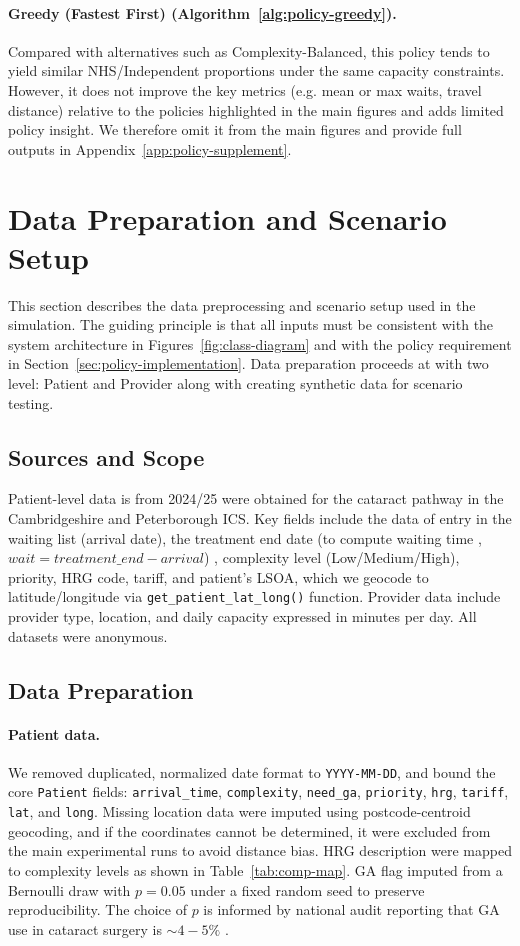 \documentclass[ %
                    author={Nattanan Nawakitbamrung},
                supervisor={Dr. Sébastien Rochat},
                    degree={MSc},
                     title={Developing and Evaluating the Impact of a Single Patient Treatment List (PTL) for an NHS Integrated Care System},
                  subtitle={},
                      type={},
                      year={2025}]{dissertation}
\begin{document}
\paragraph{Greedy (Fastest First) (Algorithm~\ref{alg:policy-greedy}).} Compared with alternatives such as Complexity-Balanced, this policy tends to yield similar NHS/Independent proportions under the same capacity constraints. However, it does not improve the key metrics (e.g. mean or max waits, travel distance) relative to the policies highlighted in the main figures and adds limited policy insight. We therefore omit it from the main figures and provide full outputs in Appendix~\ref{app:policy-supplement}.

\section{Data Preparation and Scenario Setup}
\label{sec:data-prep}
This section describes the data preprocessing  and scenario setup used in the simulation. The guiding principle is that all inputs must be consistent with the system architecture in Figures~\ref{fig:class-diagram} and with the policy requirement in Section~\ref{sec:policy-implementation}. Data preparation proceeds at with two level: Patient and Provider along with creating synthetic data for scenario testing.

\subsection{Sources and Scope}
Patient-level data is from 2024/25 were obtained for the cataract pathway in the Cambridgeshire and Peterborough ICS. Key fields include the data of entry in the waiting list (arrival date), the treatment end date (to compute waiting time , $wait = treatment\_end - arrival$) , complexity level (Low/Medium/High), priority, HRG code, tariff, and patient's LSOA, which we geocode to latitude/longitude via \texttt{get\_patient\_lat\_long()} function. Provider data include provider type, location, and daily capacity expressed in minutes per day. All datasets were anonymous.

\subsection{Data Preparation}
\paragraph{Patient data.} We removed duplicated, normalized date format to \texttt{YYYY-MM-DD}, and bound the core \texttt{Patient} fields: \texttt{arrival\_time}, \texttt{complexity}, \texttt{need\_ga}, \texttt{priority}, \texttt{hrg}, \texttt{tariff}, \texttt{lat}, and \texttt{long}. Missing location data were imputed using postcode-centroid geocoding, and if the coordinates cannot be determined, it were excluded from the main experimental runs to avoid distance bias. HRG description were mapped to complexity levels as shown in Table~\ref{tab:comp-map}. GA flag imputed from a Bernoulli draw with $p = 0.05$ under a fixed random seed to preserve reproducibility. The choice of $p$ is informed by national audit reporting that GA use in cataract surgery is $\sim4-5\%$ \cite{RCOphthWorkforce2020}.
\end{document}
